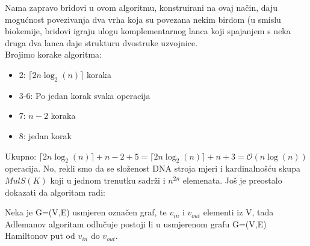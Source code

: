 \documentclass[12pt, a4paper]{book}
\begin{document}
\begin{spacing}{1.5}
Nama zapravo bridovi u ovom algoritmu, konstruirani na ovaj način, daju mogućnost povezivanja dva vrha koja su povezana nekim birdom (u smislu biokemije, bridovi igraju ulogu komplementarnog lanca koji  spajanjem s neka druga dva lanca daje strukturu dvostruke uzvojnice. \\
Brojimo korake algoritma:
\begin{itemize}
\item 2: $\lceil 2n \log _2 (n) \rceil$ koraka
\item  3-6: Po jedan korak svaka operacija
\item 7: $n-2$ koraka
\item 8: jedan korak
\end{itemize}
Ukupno: $\lceil 2n \log _2 (n) \rceil + n-2 + 5=\lceil 2n \log _2 (n) \rceil + n+3 = \mathcal{O}(n \log(n))$ operacija. No, rekli smo da se složenost DNA stroja mjeri i kardinalnošću skupa $MulS(K)$ koji u jednom trenutku sadrži i $n^{2n}$ elemenata. 
Još je preostalo dokazati da algoritam radi:
\begin{thm} Neka je G=(V,E) usmjeren označen graf, te $v_{in}$ i $v_{out}$ elementi iz V, tada Adlemanov algoritam odlučuje postoji li u usmjerenom grafu G=(V,E) Hamiltonov put od $v_{in}$ do $v_{out}$. \end{thm}


\end{spacing}
\end{document}
